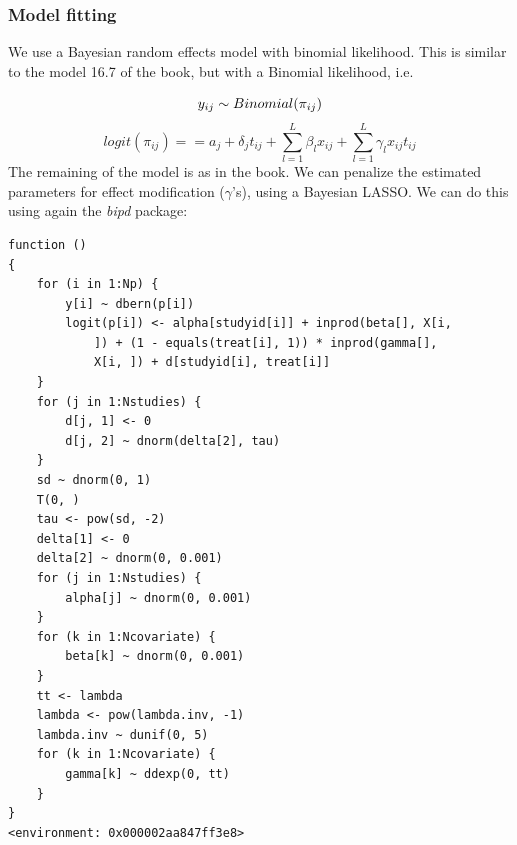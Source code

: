 \documentclass[
  letterpaper,
  DIV=11,
  numbers=noendperiod]{scrreprt}
\newenvironment{Shaded}{\begin{snugshade}}{\end{snugshade}}
\newcommand{\AttributeTok}[1]{\textcolor[rgb]{0.40,0.45,0.13}{#1}}
\newcommand{\DecValTok}[1]{\textcolor[rgb]{0.68,0.00,0.00}{#1}}
\newcommand{\FunctionTok}[1]{\textcolor[rgb]{0.28,0.35,0.67}{#1}}
\newcommand{\NormalTok}[1]{\textcolor[rgb]{0.00,0.23,0.31}{#1}}
\newcommand{\OtherTok}[1]{\textcolor[rgb]{0.00,0.23,0.31}{#1}}
\newcommand{\SpecialCharTok}[1]{\textcolor[rgb]{0.37,0.37,0.37}{#1}}
\newcommand{\StringTok}[1]{\textcolor[rgb]{0.13,0.47,0.30}{#1}}
\begin{document}
\hypertarget{model-fitting-1}{%
\subsubsection{Model fitting}\label{model-fitting-1}}

We use a Bayesian random effects model with binomial likelihood. This is
similar to the model 16.7 of the book, but with a Binomial likelihood,
i.e.~

\[ 
y_{ij}\sim Binomial(\pi_{ij}) \\
\] \[ 
logit(\pi_{ij})==a_j+\delta_j t_{ij}+ \sum_{l=1}^{L}\beta_l x_{ij}+ \sum_{l=1}^{L}\gamma_l x_{ij} t_{ij}
\] The remaining of the model is as in the book. We can penalize the
estimated parameters for effect modification (\(\gamma\)'s), using a
Bayesian LASSO. We can do this using again the \emph{bipd} package:

\begin{Shaded}
\end{Shaded}

\begin{verbatim}
function () 
{
    for (i in 1:Np) {
        y[i] ~ dbern(p[i])
        logit(p[i]) <- alpha[studyid[i]] + inprod(beta[], X[i, 
            ]) + (1 - equals(treat[i], 1)) * inprod(gamma[], 
            X[i, ]) + d[studyid[i], treat[i]]
    }
    for (j in 1:Nstudies) {
        d[j, 1] <- 0
        d[j, 2] ~ dnorm(delta[2], tau)
    }
    sd ~ dnorm(0, 1)
    T(0, )
    tau <- pow(sd, -2)
    delta[1] <- 0
    delta[2] ~ dnorm(0, 0.001)
    for (j in 1:Nstudies) {
        alpha[j] ~ dnorm(0, 0.001)
    }
    for (k in 1:Ncovariate) {
        beta[k] ~ dnorm(0, 0.001)
    }
    tt <- lambda
    lambda <- pow(lambda.inv, -1)
    lambda.inv ~ dunif(0, 5)
    for (k in 1:Ncovariate) {
        gamma[k] ~ ddexp(0, tt)
    }
}
<environment: 0x000002aa847ff3e8>
\end{verbatim}
\end{document}
